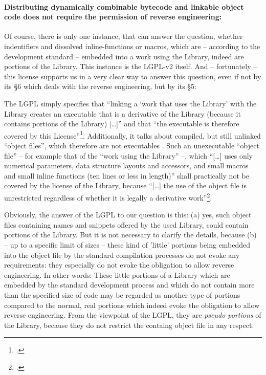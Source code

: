 \paragraph{Distributing dynamically combinable bytecode and linkable object code
does not require the permission of reverse engineering:} 

Of course, there is only one instance, that can answer the question, whether
indentifiers and dissolved inline-functions or macros, which are -- according to
the development standard -- embedded into a work using the Library, indeed are
portions of the Library. This instance is the LGPL-v2 itself. And -- fortunately
-- this license supports us in a very clear way to answer this question, even if
not by its §6 which deals with the reverse engineering, but by its §5:

The LGPL simply specifies that \enquote{linking a \enquote{work that uses the
Library} with the Library creates an executable that is a derivative of the
Library (because it contains portions of the Library) [\ldots]} and that
\enquote{the executable is therefore covered by this
License}\footcite[cf.][\nopage wp. §5]{Lgpl21OsiLicense1999a}. Additionally, it
talks about compiled, but still unlinked \enquote{object files}, which therefore
are not executables . Such an unexecutable \enquote{object file} -- for example
that of the \enquote{work using the Library} --, which \enquote{[\ldots] uses
only numerical parameters, data structure layouts and accessors, and small
macros and small inline functions (ten lines or less in length)} shall
practically not be covered by the license of the Library, because
\enquote{[\ldots] the use of the object file is unrestricted regardless of
whether it is legally a derivative work}\footcite[cf.][\nopage wp.
§5]{Lgpl21OsiLicense1999a}.

Obviously, the answer of the LGPL to our question is this: (a) yes, such
object files containing names and snippets offered by the used Library, could
contain portions of the Library. But it is not necessary to clarify the details,
because (b) -- up to a specific limit of sizes -- these kind of 'little'
portions being embedded into the object file by the standard compilation
processes do not evoke any requirements: they especially do not evoke the
obligation to allow reverse engineering. In other words: These little portions
of a Library which are embedded by the standard development process and which do
not contain more than the specified size of code may be regarded as another type
of portions compared to the normal, real portions which indeed evoke the
obligation to allow reverse engineering. From the viewpoint of the LGPL, they
are \emph{pseudo portions} of the Library, because they do not restrict the
containg object file in any respect.

